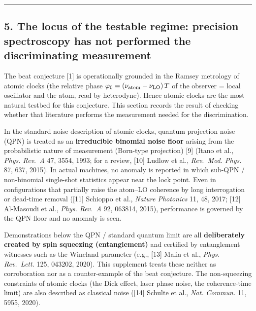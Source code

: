 \documentclass[
]{ltjsarticle}
\begin{document}
\begin{center}\rule{0.5\linewidth}{0.5pt}\end{center}

\subsection{5. The locus of the testable regime: precision spectroscopy
has not performed the discriminating
measurement}\label{the-locus-of-the-testable-regime-precision-spectroscopy-has-not-performed-the-discriminating-measurement}

The beat conjecture {[}1{]} is operationally grounded in the Ramsey
metrology of atomic clocks (the relative phase
\(\varphi_0=(\nu_{\rm atom}-\nu_{\rm LO})\,T\) of the observer = local
oscillator and the atom, read by heterodyne). Hence atomic clocks are
the most natural testbed for this conjecture. This section records the
result of checking whether that literature performs the measurement
needed for the discrimination.

In the standard noise description of atomic clocks, quantum projection
noise (QPN) is treated as an \textbf{irreducible binomial noise floor}
arising from the probabilistic nature of measurement (Born-type
projection) {[}9{]} (Itano et al., \emph{Phys. Rev.~A} 47, 3554, 1993;
for a review, {[}10{]} Ludlow et al., \emph{Rev.~Mod. Phys.} 87, 637,
2015). In actual machines, no anomaly is reported in which sub-QPN /
non-binomial single-shot statistics appear near the lock point. Even in
configurations that partially raise the atom--LO coherence by long
interrogation or dead-time removal ({[}11{]} Schioppo et al.,
\emph{Nature Photonics} 11, 48, 2017; {[}12{]} Al-Masoudi et al.,
\emph{Phys. Rev.~A} 92, 063814, 2015), performance is governed by the
QPN floor and no anomaly is seen.

Demonstrations below the QPN / standard quantum limit are all
\textbf{deliberately created by spin squeezing (entanglement)} and
certified by entanglement witnesses such as the Wineland parameter
(e.g., {[}13{]} Malia et al., \emph{Phys. Rev.~Lett.} 125, 043202,
2020). This supplement treats these neither as corroboration nor as a
counter-example of the beat conjecture. The non-squeezing constraints of
atomic clocks (the Dick effect, laser phase noise, the coherence-time
limit) are also described as classical noise ({[}14{]} Schulte et al.,
\emph{Nat. Commun.} 11, 5955, 2020).
\end{document}
